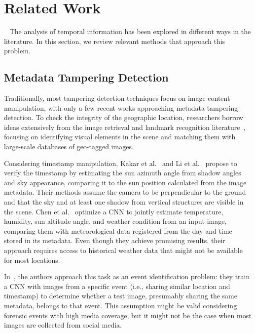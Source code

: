 \documentclass[journal]{IEEEtran}
\begin{document}
    
    

\section{Related Work}~\label{sec:related_work}
    The analysis of temporal information has been explored in different ways in the literature. In this section, we review relevant methods that approach this problem. 

    \subsection{Metadata Tampering Detection}
        Traditionally, most tampering detection techniques focus on image content manipulation, with only a few recent works approaching metadata tampering detection. To check the integrity of the geographic location, researchers borrow ideas extensively from the image retrieval and landmark recognition literature~\cite{hays2008im2gps, noh2017large, radenovic2018fine, weyand2016planet}, focusing on identifying visual elements in the scene and matching them with large-scale databases of geo-tagged images.
        
        Considering timestamp manipulation, Kakar et al.~\cite{kakar2012verifying} and Li et al.~\cite{li2017you} propose to verify the timestamp by estimating the sun azimuth angle from shadow angles and sky appearance, comparing it to the sun position calculated from the image metadata. Their methods assume the camera to be perpendicular to the ground and that the sky and at least one shadow from vertical structures are visible in the scene. Chen et al.~\cite{ghosh2017detection} optimize a CNN to jointly estimate temperature, humidity, sun altitude angle, and weather condition from an input image, comparing them with meteorological data registered from the day and time stored in its metadata. Even though they achieve promising results, their approach requires access to historical weather data that might not be available for most locations. 
        
        In~\cite{chen2019deep}, the authors approach this task as an event identification problem: they train a CNN with images from a specific event (i.e., sharing similar location and timestamp) to determine whether a test image, presumably sharing the same metadata, belongs to that event. This assumption might be valid considering forensic events with high media coverage, but it might not be the case when most images are collected from social media. 
        
\end{document}
